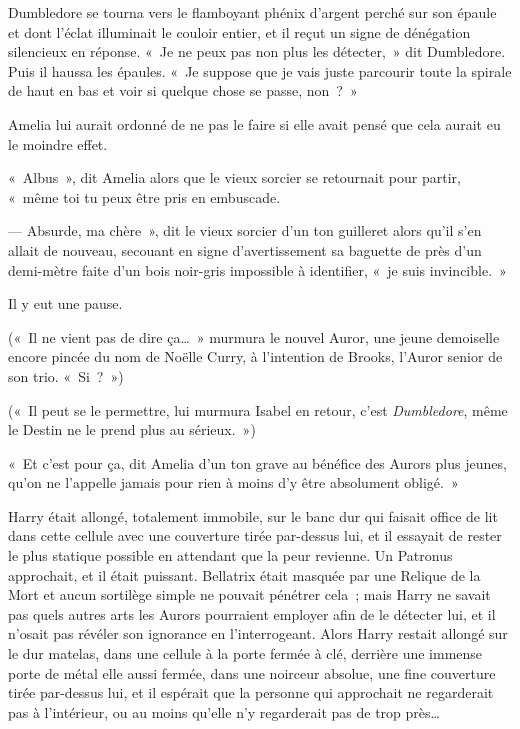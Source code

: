 Dumbledore se tourna vers le flamboyant phénix d'argent perché sur son épaule et dont l'éclat illuminait le couloir entier, et il reçut un signe de dénégation silencieux en réponse. «~Je ne peux pas non plus les détecter,~» dit Dumbledore. Puis il haussa les épaules. «~Je suppose que je vais juste parcourir toute la spirale de haut en bas et voir si quelque chose se passe, non~?~»

Amelia lui aurait ordonné de ne pas le faire si elle avait pensé que cela aurait eu le moindre effet.

«~Albus~», dit Amelia alors que le vieux sorcier se retournait pour partir, «~même toi tu peux être pris en embuscade.

--- Absurde, ma chère~», dit le vieux sorcier d'un ton guilleret alors qu'il s'en allait de nouveau, secouant en signe d'avertissement sa baguette de près d'un demi-mètre faite d'un bois noir-gris impossible à identifier, «~je suis invincible.~»

Il y eut une pause.

(«~Il ne vient pas de dire ça…~» murmura le nouvel Auror, une jeune demoiselle encore pincée du nom de Noëlle Curry, à l'intention de Brooks, l'Auror senior de son trio. «~Si~?~»)

(«~Il peut se le permettre, lui murmura Isabel en retour, c'est \emph{Dumbledore}, même le Destin ne le prend plus au sérieux.~»)

«~Et c'est pour ça, dit Amelia d'un ton grave au bénéfice des Aurors plus jeunes, qu'on ne l'appelle jamais pour rien à moins d'y être absolument obligé.~»

\later

Harry était allongé, totalement immobile, sur le banc dur qui faisait office de lit dans cette cellule avec une couverture tirée par-dessus lui, et il essayait de rester le plus statique possible en attendant que la peur revienne. Un Patronus approchait, et il était puissant. Bellatrix était masquée par une Relique de la Mort et aucun sortilège simple ne pouvait pénétrer cela~; mais Harry ne savait pas quels autres arts les Aurors pourraient employer afin de le détecter lui, et il n'osait pas révéler son ignorance en l'interrogeant. Alors Harry restait allongé sur le dur matelas, dans une cellule à la porte fermée à clé, derrière une immense porte de métal elle aussi fermée, dans une noirceur absolue, une fine couverture tirée par-dessus lui, et il espérait que la personne qui approchait ne regarderait pas à l'intérieur, ou au moins qu'elle n'y regarderait pas de trop près…

